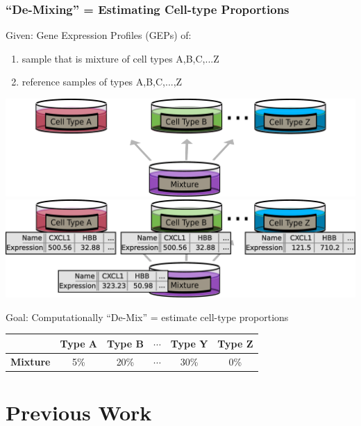 \documentclass[usenames,dvipsnames,15pt]{beamer}
\renewcommand{\alert}[1]{{\color{NavyBlue} #1}}
\begin{document}
\begin{frame}
  \frametitle{``De-Mixing'' = Estimating Cell-type Proportions}
  \alert{\large Given:} Gene Expression Profiles (GEPs) of:
  \begin{enumerate}
  \item sample that is mixture of cell types A,B,C,...Z
  \item reference samples of types A,B,C,...,Z\\
  \end{enumerate}
  \hspace{1cm}\begin{center}
    \begin{overprint}
      \hspace{-.75cm}\includegraphics[scale=.28]{pictures/mixture_cartoon}
      \hspace*{-.77cm}\includegraphics[scale=.28]{pictures/mixture_cartoon_data}
    \end{overprint}
  \end{center}
  \alert{\large Goal:} Computationally ``De-Mix'' = estimate cell-type proportions
  {\scriptsize \begin{center}\begin{tabular}{c||c|c|c|c|c}
      & \bf Type A& \bf Type B& $\cdots$& \bf Type Y&\bf  Type Z\\\hline\hline
    \bf Mixture& 5\%& 20\%& $\cdots$& 30\%& 0\%
  \end{tabular}\end{center}}
\end{frame}

\setcounter{subsection}{0}
\section{Previous Work}
\end{document}
